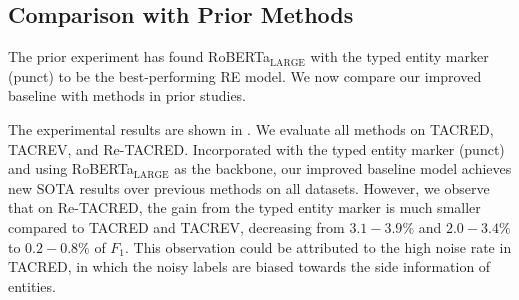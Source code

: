 \documentclass[11pt,a4paper]{article}
\begin{document}
\subsection{Comparison with Prior Methods}\label{ssec:main}

The prior experiment has found RoBERTa$_{\text{LARGE}}$ with the typed entity marker (punct) to be the best-performing RE model.
We now compare our improved baseline with methods in prior studies.

The experimental results are shown in .
We evaluate all methods on TACRED, TACREV, and Re-TACRED.
Incorporated with the typed entity marker (punct) and using RoBERTa$_{\text{LARGE}}$ as the backbone, our improved baseline model achieves new SOTA results over previous methods on all datasets.
However, we observe that on Re-TACRED, the gain from the typed entity marker is much smaller compared to TACRED and TACREV, decreasing from $3.1-3.9\%$ and $2.0-3.4\%$ to $0.2-0.8\%$ of $F_1$.
This observation could be attributed to the high noise rate in TACRED, in which the noisy labels are biased towards the side information of entities.
\end{document}
